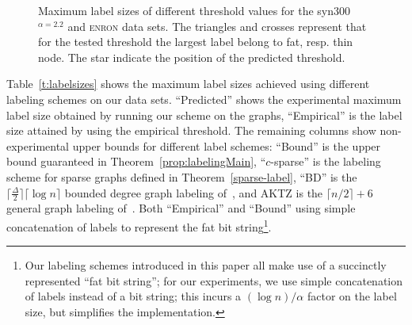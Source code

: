 \begin{figure}[!ht]
\centering
{}\hspace*{-2.5em}
%
\caption{Maximum label sizes of different threshold values for the   syn300$^{\alpha=2.2}$ and \textsc{enron} data sets.
The triangles and crosses represent that for the tested threshold the largest label belong to fat, resp. thin node. The star indicate the position of the predicted threshold.}
\label{fig:findings}%
\end{figure}

Table~\ref{t:labelsizes}  shows  the maximum label sizes achieved using different labeling schemes on our data sets. ``Predicted'' shows the experimental maximum label size obtained by running our scheme on the graphs, ``Empirical'' is the label size attained by using the empirical threshold. The remaining columns show non-experimental upper bounds for different label schemes: ``Bound'' is the upper bound guaranteed in Theorem~\ref{prop:labelingMain}, ``$c$-sparse'' is  the labeling scheme for sparse graphs defined in Theorem~\ref{sparse-label}, ``BD'' is the $\lceil \frac{\Delta}{2} \rceil \lceil \log n\rceil$ bounded degree graph  labeling of~\cite{adjiashvili2014labeling}, and AKTZ is the $\lceil n/2\rceil+6$ general graph  labeling of~\cite{alstrup2014adjacency}.
Both ``Empirical'' and  ``Bound'' using simple concatenation of labels to represent the fat bit string\footnote{Our labeling schemes introduced in this paper all make use of a succinctly represented ``fat bit string''; for our experiments, we use simple concatenation of labels instead of a bit string; this incurs a $(\log n)/\alpha$ factor on the label size, but simplifies the implementation.}.
 

